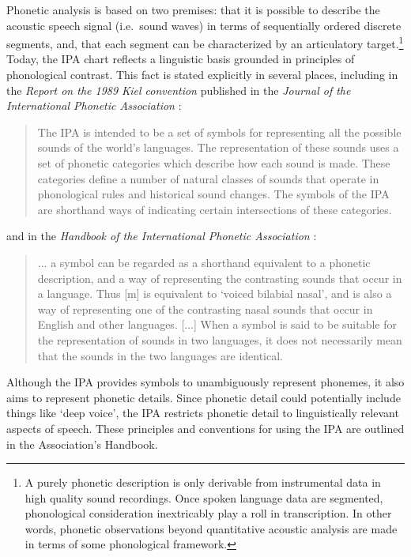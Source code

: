 Phonetic analysis is based on two premises: that it is possible to describe 
the acoustic speech signal (i.e.\ sound waves) in terms of sequentially ordered 
discrete segments, and, that each segment can be characterized by an articulatory 
target.\footnote{A purely phonetic description is only derivable from instrumental 
data in high quality sound recordings. Once spoken language data are segmented, 
phonological consideration inextricably play a roll in transcription. In other 
words, phonetic observations beyond quantitative acoustic analysis are made in 
terms of some phonological framework.} Today, the IPA chart reflects a linguistic 
basis grounded in principles of phonological contrast. This fact is stated 
explicitly in several places, including in the \textit{Report on the 1989 Kiel 
convention} published in the \textit{Journal of the International Phonetic 
Association} \citep[67-68]{International1989report}:

\begin{quote}
The IPA is intended to be a set of symbols for representing all the possible 
sounds of the world's languages. The representation of these sounds uses a set 
of phonetic categories which describe how each sound is made. These categories 
define a number of natural classes of sounds that operate in phonological rules 
and historical sound changes. The symbols of the IPA are shorthand ways of 
indicating certain intersections of these categories.
\end{quote}

\noindent and in the \textit{Handbook of the International Phonetic Association} \citep[18]{IPA1993}: 

\begin{quote}
... a symbol can be regarded as a shorthand equivalent to a phonetic description, 
and a way of representing the contrasting sounds that occur in a language. Thus 
[m] is equivalent to `voiced bilabial nasal', and is also a way of representing 
one of the contrasting nasal sounds that occur in English and other languages. 
[...] When a symbol is said to be suitable for the representation of sounds in 
two languages, it does not necessarily mean that the sounds in the two languages 
are identical.
\end{quote}

\noindent Although the IPA provides symbols to unambiguously represent phonemes, 
it also aims to represent phonetic details. Since phonetic detail could potentially 
include things like `deep voice', the IPA restricts phonetic detail to linguistically 
relevant aspects of speech. These principles and conventions for using the IPA are 
outlined in the Association's Handbook.


